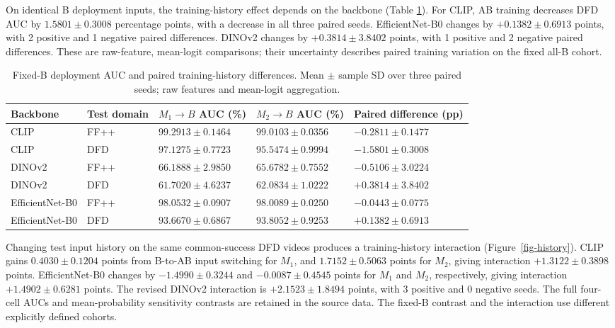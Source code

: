 \documentclass{ieeeaccess}
\begin{document}
On identical B deployment inputs, the training-history effect depends on
the backbone (Table \ref{tab:h-fixed}). For CLIP, AB training decreases
DFD AUC by \(1.5801\pm0.3008\) percentage points, with a decrease in all
three paired seeds. EfficientNet-B0 changes by \(+0.1382\pm0.6913\)
points, with 2 positive and 1 negative paired differences. DINOv2
changes by \(+0.3814\pm3.8402\) points, with 1 positive and 2 negative
paired differences. These are raw-feature, mean-logit comparisons; their
uncertainty describes paired training variation on the fixed all-B
cohort.

\begin{table}[t]
\centering
\caption{Fixed-B deployment AUC and paired training-history differences. Mean $\pm$ sample SD over three paired seeds; raw features and mean-logit aggregation.}
\label{tab:h-fixed}
\setlength{\tabcolsep}{5pt}
\footnotesize
\begin{tabular}{lllll}
\toprule
Backbone & Test domain & $M_1\to B$ AUC (\%) & $M_2\to B$ AUC (\%) & Paired difference (pp) \\
\midrule
CLIP & FF++ & $99.2913\pm0.1464$ & $99.0103\pm0.0356$ & $-0.2811\pm0.1477$ \\
CLIP & DFD & $97.1275\pm0.7723$ & $95.5474\pm0.9994$ & $-1.5801\pm0.3008$ \\
DINOv2 & FF++ & $66.1888\pm2.9850$ & $65.6782\pm0.7552$ & $-0.5106\pm3.0224$ \\
DINOv2 & DFD & $61.7020\pm4.6237$ & $62.0834\pm1.0222$ & $+0.3814\pm3.8402$ \\
EfficientNet-B0 & FF++ & $98.0532\pm0.0907$ & $98.0089\pm0.0250$ & $-0.0443\pm0.0775$ \\
EfficientNet-B0 & DFD & $93.6670\pm0.6867$ & $93.8052\pm0.9253$ & $+0.1382\pm0.6913$ \\
\bottomrule
\end{tabular}
\end{table}

Changing test input history on the same common-success DFD videos
produces a training-history interaction (Figure~\ref{fig-history}). CLIP
gains \(0.4030\pm0.1204\) points from B-to-AB input switching for
\(M_1\), and \(1.7152\pm0.5063\) points for \(M_2\), giving interaction
\(+1.3122\pm0.3898\) points. EfficientNet-B0 changes by
\(-1.4990\pm0.3244\) and \(-0.0087\pm0.4545\) points for \(M_1\) and
\(M_2\), respectively, giving interaction \(+1.4902\pm0.6281\) points.
The revised DINOv2 interaction is \(+2.1523\pm1.8494\) points, with 3
positive and 0 negative seeds. The full four-cell AUCs and
mean-probability sensitivity contrasts are retained in the source data.
The fixed-B contrast and the interaction use different explicitly
defined cohorts.
\end{document}
